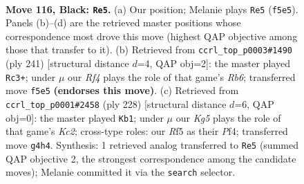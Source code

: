 \documentclass[11pt]{article}
\begin{document}
\begin{figure}[p]\centering
\begin{subfigure}{0.46\textwidth}\centering
\resizebox{\linewidth}{!}{%
\newchessgame
\chessboard[
  setfen={7K/8/8/5r2/6k1/8/8/8 b - - 17 116},
  showmover=false,
  pgfstyle=straightmove, color=movearrow, markmove={f5-e5}
]}
\caption{}
\end{subfigure}\hfill
\begin{subfigure}{0.46\textwidth}\centering
\resizebox{\linewidth}{!}{%
\newchessgame
\chessboard[
  setfen={8/8/8/2K5/k7/1r6/4Q3/8 b - - 18 121},
  showmover=false,
  pgfstyle=straightmove, color=movearrow, markmove={b3-c3}
]}
\caption{}
\end{subfigure}
\\[4pt]
\begin{subfigure}{0.46\textwidth}\centering
\resizebox{\linewidth}{!}{%
\newchessgame
\chessboard[
  setfen={8/8/8/2k5/5P2/8/2K5/8 w - - 0 115},
  showmover=false,
  pgfstyle=straightmove, color=movearrow, markmove={c2-b1}
]}
\caption{}
\end{subfigure}\hfill

\caption{\textbf{Move 116, Black: \texttt{Re5}.} (a) Our position; Melanie plays \texttt{Re5} (\texttt{f5e5}). Panels (b)--(d) are the retrieved master positions whose correspondence most drove this move (highest QAP objective among those that transfer to it). (b) Retrieved from \texttt{ccrl\_top\_p0003\#1490} (ply 241) [structural distance $d$=4, QAP obj=2]: the master played \texttt{Rc3+}; under $\mu$ our \emph{Rf4} plays the role of that game's \emph{Rb6}; transferred move \texttt{f5e5} \textbf{(endorses this move)}. (c) Retrieved from \texttt{ccrl\_top\_p0001\#2458} (ply 228) [structural distance $d$=6, QAP obj=0]: the master played \texttt{Kb1}; under $\mu$ our \emph{Kg5} plays the role of that game's \emph{Kc2}; cross-type roles: our \emph{R}f5 as their \emph{P}f4; transferred move \texttt{g4h4}. Synthesis: 1 retrieved analog transferred to \texttt{Re5} (summed QAP objective 2, the strongest correspondence among the candidate moves); Melanie committed it via the \texttt{search} selector.}
\label{fig:thought-m231}
\end{figure}

\clearpage
\end{document}
